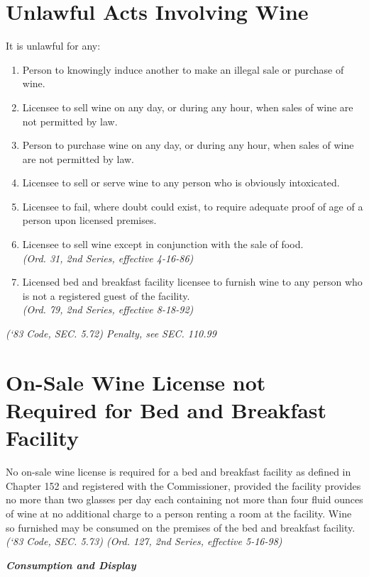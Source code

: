 \section{Unlawful Acts Involving Wine}
It is unlawful for any:
\begin{enumerate}[{\indent}A)]
    \item Person to knowingly induce another to make an illegal sale or purchase of wine.
    \item Licensee to sell wine on any day, or during any hour, when sales of wine are not permitted by law.
    \item Person to purchase wine on any day, or during any hour, when sales of wine are not permitted by law.
    \item Licensee to sell or serve wine to any person who is obviously intoxicated.
    \item Licensee to fail, where doubt could exist, to require adequate proof of age of a person upon licensed premises.
    \item Licensee to sell wine except in conjunction with the sale of food.\\
        \emph{(Ord. 31, 2nd Series, effective 4-16-86)}
    \item Licensed bed and breakfast facility licensee to furnish wine to any person who is not a registered guest of the facility.\\
        \emph{(Ord. 79, 2nd Series, effective 8-18-92)}
\end{enumerate}
\emph{(‘83 Code, SEC. 5.72)  Penalty, see SEC. 110.99}
\section{On-Sale Wine License not Required for Bed and Breakfast Facility}
No on-sale wine license is required for a bed and breakfast facility as defined in Chapter 152 and registered with the Commissioner, provided the facility provides no more than two glasses per day each containing not more than four fluid ounces of wine at no additional charge to a person renting a room at the facility.  Wine so furnished may be consumed on the premises of the bed and breakfast facility.\\
\emph{(‘83 Code, SEC. 5.73)  (Ord. 127, 2nd Series, effective 5-16-98)}

\begin{center}
    \emph{\textbf{\LARGE{Consumption and Display}}}
\end{center}

